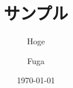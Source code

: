 \documentclass[
    aspectratio=169,   %
    xcolor={           %
        rgb,           %
        svgnames},     %
    unicode,           %
    12pt,              %
    unknownkeysallowed %
]{beamer}
\title{サンプル}
\subtitle{Hoge}
\author{Fuga}
\institute{Piyo}
\date{\today}
\begin{document}
\begin{frame}[plain,b]
  \titlepage
\end{frame}

\end{document}
